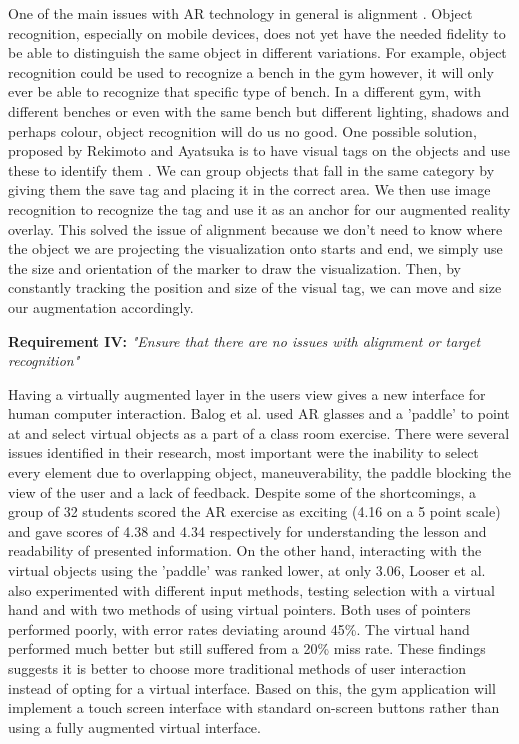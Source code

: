 \documentclass{l4proj}
\begin{document}
One of the main issues with AR technology in general is alignment \cite{sood_pro_2012}. Object recognition, especially on mobile devices, does not yet have the needed fidelity to be able to distinguish the same object in different variations. For example, object recognition could be used to recognize a bench in the gym however, it will only ever be able to recognize that specific type of bench. In a different gym, with different benches or even with the same bench but different lighting, shadows and perhaps colour, object recognition will do us no good. One possible solution, proposed by Rekimoto and Ayatsuka is to have visual tags on the objects and use these to identify them \cite{rekimoto_cybercode:_2000}. We can group objects that fall in the same category by giving them the save tag and placing it in the correct area. We then use image recognition to recognize the tag and use it as an anchor for our augmented reality overlay. This solved the issue of alignment because we don't need to know where the object we are projecting the visualization onto starts and end, we simply use the size and orientation of the marker to draw the visualization. Then, by constantly tracking the position and size of the visual tag, we can move and size our augmentation accordingly.

\textbf{Requirement IV:} \textit{"Ensure that there are no issues with alignment or target recognition"}  

Having a virtually augmented layer in the users view gives a new interface for human computer interaction. Balog et al. used AR glasses and a 'paddle' to point at and select virtual objects as a part of a class room exercise. There were several issues identified in their research, most important were the inability to select every element due to overlapping object, maneuverability, the paddle blocking the view of the user and a lack of feedback\cite{balog_augmented_2007}. Despite some of the shortcomings, a group of 32 students scored the AR exercise as exciting (4.16 on a 5 point scale) and gave scores of 4.38 and 4.34 respectively for understanding the lesson and readability of presented information\cite{looser_evaluation_2007}. On the other hand, interacting with the virtual objects using the 'paddle' was ranked lower, at only 3.06\cite{balog_augmented_2007}, Looser et al. also experimented with different input methods, testing selection with a virtual hand and with two methods of using virtual pointers\cite{looser_evaluation_2007}. Both uses of pointers performed poorly, with error rates deviating around 45\%\cite{looser_evaluation_2007}. The virtual hand performed much better but still suffered from a 20\% miss rate\cite{looser_evaluation_2007}. These findings suggests it is better to choose  more traditional methods of user interaction instead of opting for a virtual interface. Based on this, the gym application will implement a touch screen interface with standard on-screen buttons rather than using a fully augmented virtual interface. 
\end{document}
